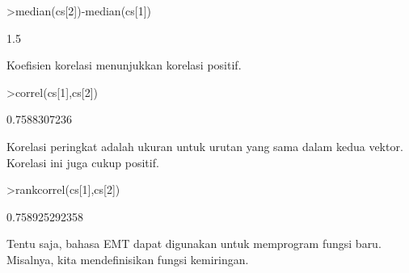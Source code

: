 \documentclass[a4paper,10pt]{article}
\begin{document}
\begin{eulernotebook}
\begin{eulercomment}
\begin{eulercomment}
\begin{eulercomment}
\begin{eulercomment}
\begin{eulercomment}
\begin{eulercomment}
\begin{eulercomment}
\begin{eulercomment}
\begin{eulercomment}
\begin{eulercomment}
\begin{eulercomment}
\begin{eulercomment}
\begin{eulercomment}
\begin{eulercomment}
\begin{eulercomment}
\begin{eulercomment}
\begin{eulercomment}
\begin{eulercomment}
\begin{eulercomment}
\begin{eulercomment}
\begin{eulercomment}
\begin{eulercomment}
\begin{eulercomment}
\begin{eulercomment}
\begin{eulercomment}
\begin{eulercomment}
\begin{eulercomment}
\begin{eulercomment}
\begin{eulercomment}
\begin{eulercomment}
\begin{eulercomment}
\begin{eulercomment}
\begin{eulercomment}
\begin{eulercomment}
\begin{eulercomment}
\begin{eulercomment}
\begin{eulercomment}
\begin{eulercomment}
\begin{eulercomment}
\begin{eulercomment}
\begin{eulercomment}
\begin{eulercomment}
\begin{eulercomment}
\begin{eulercomment}
\begin{eulerprompt}
>median(cs[2])-median(cs[1])
\end{eulerprompt}
\begin{euleroutput}
  1.5
\end{euleroutput}
\begin{eulercomment}
Koefisien korelasi menunjukkan korelasi positif.
\end{eulercomment}
\begin{eulerprompt}
>correl(cs[1],cs[2])
\end{eulerprompt}
\begin{euleroutput}
  0.7588307236
\end{euleroutput}
\begin{eulercomment}
Korelasi peringkat adalah ukuran untuk urutan yang sama dalam kedua
vektor. Korelasi ini juga cukup positif.
\end{eulercomment}
\begin{eulerprompt}
>rankcorrel(cs[1],cs[2])
\end{eulerprompt}
\begin{euleroutput}
  0.758925292358
\end{euleroutput}
\begin{eulercomment}
Tentu saja, bahasa EMT dapat digunakan untuk memprogram fungsi baru.
Misalnya, kita mendefinisikan fungsi kemiringan.


\end{eulercomment}
\end{eulercomment}
\end{eulercomment}
\end{eulercomment}
\end{eulercomment}
\end{eulercomment}
\end{eulercomment}
\end{eulercomment}
\end{eulercomment}
\end{eulercomment}
\end{eulercomment}
\end{eulercomment}
\end{eulercomment}
\end{eulercomment}
\end{eulercomment}
\end{eulercomment}
\end{eulercomment}
\end{eulercomment}
\end{eulercomment}
\end{eulercomment}
\end{eulercomment}
\end{eulercomment}
\end{eulercomment}
\end{eulercomment}
\end{eulercomment}
\end{eulercomment}
\end{eulercomment}
\end{eulercomment}
\end{eulercomment}
\end{eulercomment}
\end{eulercomment}
\end{eulercomment}
\end{eulercomment}
\end{eulercomment}
\end{eulercomment}
\end{eulercomment}
\end{eulercomment}
\end{eulercomment}
\end{eulercomment}
\end{eulercomment}
\end{eulercomment}
\end{eulercomment}
\end{eulercomment}
\end{eulercomment}
\end{eulercomment}
\end{eulernotebook}
\end{document}
